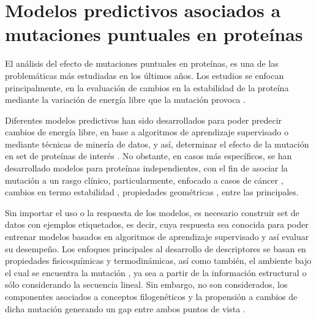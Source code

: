 
\chapter{Modelos predictivos asociados a mutaciones puntuales en proteínas}

\ifpdf
    \graphicspath{{Chapter2/Figs/Raster/}{Chapter2/Figs/PDF/}{Chapter2/Figs/}}
\else
    \graphicspath{{Chapter2/Figs/Vector/}{Chapter2/Figs/}}
\fi

El análisis del efecto de mutaciones puntuales en proteínas, es una de las problemáticas más estudiadas en los últimos años. Los estudios se enfocan principalmente, en la evaluación de cambios en la estabilidad de la proteína mediante la variación de energía libre que la mutación provoca \cite{Schymkowitz2005,Pandurangan2017,rohl2004protein,Parthiban2006}. 

Diferentes modelos predictivos han sido desarrollados para poder predecir cambios de energía libre, en base a algoritmos de aprendizaje supervisado o mediante técnicas de minería de datos, y así, determinar el efecto de la mutación en set de proteínas de interés \cite{Quan2016,Capriotti2008,Broom2017,Khan2010,vaisman,Getov2016,Capriotti2005}. No obstante, en casos más específicos, se han desarrollado modelos para proteínas independientes, con el fin de asociar la mutación a un rasgo clínico, particularmente, enfocado a casos de cáncer \cite{article, Forbes2010}, cambios en termo estabilidad \cite{Tian2010}, propiedades geométricas \cite{Barenboim2008}, entre las principales.

Sin importar el uso o la respuesta de los modelos, es necesario construir set de datos con ejemplos etiquetados, es decir, cuya respuesta sea conocida para poder entrenar modelos basados en algoritmos de aprendizaje supervisado y así evaluar su desempeño. Los enfoques principales al desarrollo de descriptores se basan en propiedades fisicoquímicas y termodinámicas, así como también, el ambiente bajo el cual se encuentra la mutación \cite{Capriotti2005}, ya sea a partir de la información estructural o sólo considerando la secuencia lineal. Sin embargo, no son considerados, los componentes asociados a conceptos filogenéticos y la propensión a cambios de dicha mutación generando un gap entre ambos puntos de vista \cite{Olivera-Nappa2011}.

